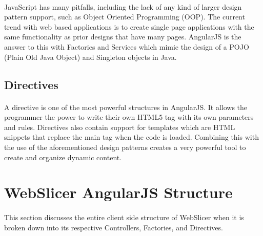 \paragraph{}
JavaScript has many pitfalls, including the lack of any kind of larger design pattern support, such as Object Oriented Programming (OOP).
The current trend with web based applications is to create single page applications with the same functionality as prior designs that have many pages.
AngularJS is the answer to this with Factories and Services which mimic the design of a POJO (Plain Old Java Object) and Singleton objects in Java.

\subsection{Directives}
\paragraph{}
A directive is one of the most powerful structures in AngularJS.
It allows the programmer the power to write their own HTML5 tag with its own parameters and rules.
Directives also contain support for templates which are HTML snippets that replace the main tag when the code is loaded.
Combining this with the use of the aforementioned design patterns creates a very powerful tool to create and organize dynamic content.

\section{WebSlicer AngularJS Structure}
\paragraph{}
This section discusses the entire client side structure of WebSlicer when it is broken down into its respective Controllers, Factories, and Directives.

